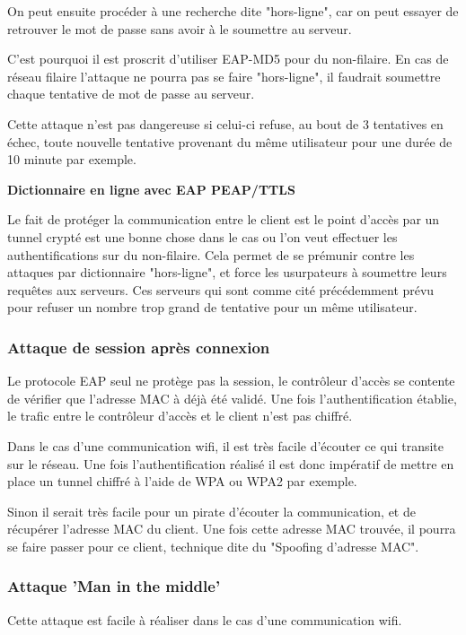 On peut ensuite procéder à une recherche dite "hors-ligne", car on peut essayer de retrouver le mot de passe sans avoir à le soumettre au serveur. 

C'est pourquoi il est proscrit d'utiliser EAP-MD5 pour du non-filaire. En cas de réseau filaire l'attaque ne pourra pas se faire "hors-ligne", il faudrait soumettre chaque tentative de mot de passe au serveur. 

Cette attaque n'est pas dangereuse si celui-ci refuse, au bout de 3 tentatives en échec, toute nouvelle tentative provenant du même utilisateur pour une durée de 10 minute par exemple. 

\textbf{Dictionnaire en ligne avec EAP PEAP/TTLS}

Le fait de protéger la communication entre le client est le point d'accès par un tunnel crypté est une bonne chose dans le cas ou l'on veut effectuer les authentifications sur du non-filaire.
Cela permet de se prémunir contre les attaques par dictionnaire "hors-ligne", et force les usurpateurs à soumettre leurs requêtes aux serveurs. 
Ces serveurs qui sont comme cité précédemment prévu pour refuser un nombre trop grand de tentative pour un même utilisateur. 

\subsubsection{Attaque de session après connexion}

Le protocole EAP seul ne protège pas la session, le contrôleur d’accès se contente de vérifier que l’adresse MAC à déjà été validé. Une fois l’authentification établie, le trafic entre le contrôleur d'accès et le client n’est pas chiffré. 

Dans le cas d’une communication wifi, il est très facile d'écouter ce qui transite sur le réseau. Une fois l'authentification réalisé il est donc impératif de mettre en place un tunnel chiffré à l’aide de WPA ou WPA2 par exemple. 

Sinon il serait très facile pour un pirate d'écouter la communication, et de récupérer l'adresse MAC du client. Une fois cette adresse MAC trouvée, il pourra se faire passer pour ce client, technique dite du "Spoofing d'adresse MAC". 

\subsubsection{Attaque 'Man in the middle'}

Cette attaque est facile à réaliser dans le cas d’une communication wifi. 

